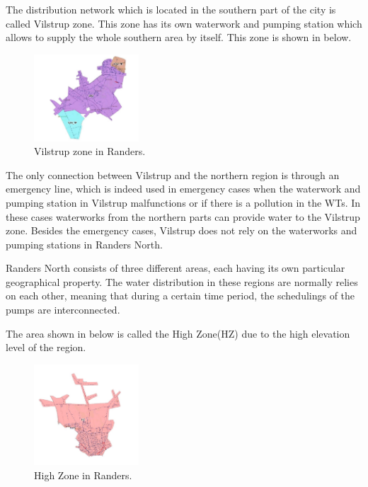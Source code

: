 The distribution network which is located in the southern part of the city is called Vilstrup zone. This zone has its own waterwork and pumping station which allows to supply the whole southern area by itself. This zone is shown in  below.

\begin{figure}[H]
\centering
\includegraphics[width=0.35\textwidth]{report/pictures/Vilstrup_region}
\caption{Vilstrup zone in Randers.}
\label{fig:vilstrup_region}
\end{figure}

The only connection between Vilstrup and the northern region is through an emergency line, which is indeed used in emergency cases when the waterwork and pumping station in Vilstrup malfunctions or if there is a pollution in the WTs. In these cases waterworks from the northern parts can provide water to the Vilstrup zone. Besides the emergency cases, Vilstrup does not rely on the waterworks and pumping stations in Randers North.  

Randers North consists of three different areas, each having its own particular geographical property. The water distribution in these regions are normally relies on each other, meaning that during a certain time period, the schedulings of the pumps are interconnected. 

The area shown in  below is called the High Zone(HZ) due to the high elevation level of the region. 

\begin{figure}[H]
\centering
\includegraphics[width=0.35\textwidth]{report/pictures/Highzone_region}
\caption{High Zone in Randers.}
\label{fig:highzone_region}
\end{figure}

